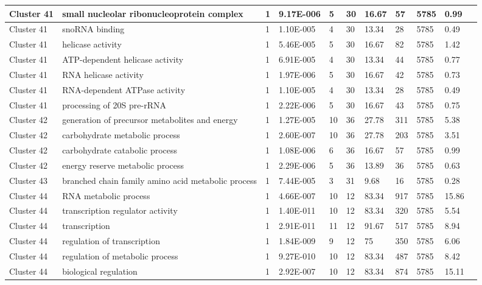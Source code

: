 \begin{tabular}{|l|l|l|l|l|l|l|l|l|l|l|}
\hline
Cluster 41&small nucleolar ribonucleoprotein complex&1&9.17E-006&5&30&16.67&57&5785&0.99&\\
\hline
Cluster 41&snoRNA binding&1&1.10E-005&4&30&13.34&28&5785&0.49&\\
\hline
Cluster 41&helicase activity&1&5.46E-005&5&30&16.67&82&5785&1.42&\\
\hline
Cluster 41&ATP-dependent helicase activity&1&6.91E-005&4&30&13.34&44&5785&0.77&\\
\hline
Cluster 41&RNA helicase activity&1&1.97E-006&5&30&16.67&42&5785&0.73&\\
\hline
Cluster 41&RNA-dependent ATPase activity&1&1.10E-005&4&30&13.34&28&5785&0.49&\\
\hline
Cluster 41&processing of 20S pre-rRNA&1&2.22E-006&5&30&16.67&43&5785&0.75&\\
\hline
Cluster 42&generation of precursor metabolites and energy&1&1.27E-005&10&36&27.78&311&5785&5.38&\\
\hline
Cluster 42&carbohydrate metabolic process&1&2.60E-007&10&36&27.78&203&5785&3.51&\\
\hline
Cluster 42&carbohydrate catabolic process&1&1.08E-006&6&36&16.67&57&5785&0.99&\\
\hline
Cluster 42&energy reserve metabolic process&1&2.29E-006&5&36&13.89&36&5785&0.63&\\
\hline
Cluster 43&branched chain family amino acid metabolic process&1&7.44E-005&3&31&9.68&16&5785&0.28&\\
\hline
Cluster 44&RNA metabolic process&1&4.66E-007&10&12&83.34&917&5785&15.86&\\
\hline
Cluster 44&transcription regulator activity&1&1.40E-011&10&12&83.34&320&5785&5.54&\\
\hline
Cluster 44&transcription&1&2.91E-011&11&12&91.67&517&5785&8.94&\\
\hline
Cluster 44&regulation of transcription&1&1.84E-009&9&12&75&350&5785&6.06&\\
\hline
Cluster 44&regulation of metabolic process&1&9.27E-010&10&12&83.34&487&5785&8.42&\\
\hline
Cluster 44&biological regulation&1&2.92E-007&10&12&83.34&874&5785&15.11&\\
\hline
\end{tabular}
